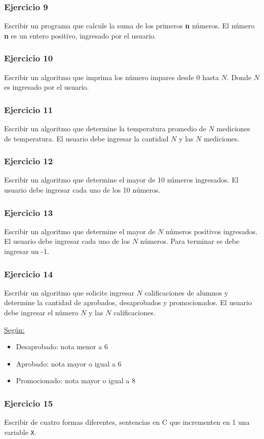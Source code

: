 \subsubsection{Ejercicio 9}
Escribir un programa que calcule la suma de los primeros \textbf{n} números. El número \textbf{n} es un entero positivo, ingresado por el usuario.

\subsubsection{Ejercicio 10}
Escribir un algoritmo que imprima los número impares desde 0 hasta $N$. Donde $N$ es ingresado por el usuario.

\subsubsection{Ejercicio 11}
Escribir un algoritmo que determine la temperatura promedio de $N$ mediciones de temperatura. El usuario debe ingresar la cantidad $N$ y las $N$ mediciones. 

\subsubsection{Ejercicio 12}
Escribir un algoritmo que determine el mayor de 10 números ingresados. El usuario debe ingresar cada uno de los 10 números.

\subsubsection{Ejercicio 13}
Escribir un algoritmo que determine el mayor de $N$ números positivos ingresados. El usuario debe ingresar cada uno de los $N$ números. Para terminar se debe ingresar un -1.

\subsubsection{Ejercicio 14}
Escribir un algoritmo que solicite ingresar $N$ calificaciones de alumnos y determine la cantidad de aprobados, desaprobados y promocionados. 
El usuario debe ingresar el número $N$ y las $N$ calificaciones.

\underline{Según:}
\begin{itemize}
  \item Desaprobado: nota menor a 6
  \item Aprobado: nota mayor o igual a 6
  \item Promocionado: nota mayor o igual a 8
\end{itemize}

\subsubsection{Ejercicio 15}
Escribir de cuatro formas diferentes, sentencias en C que incrementen en 1 una variable \texttt{X}.
